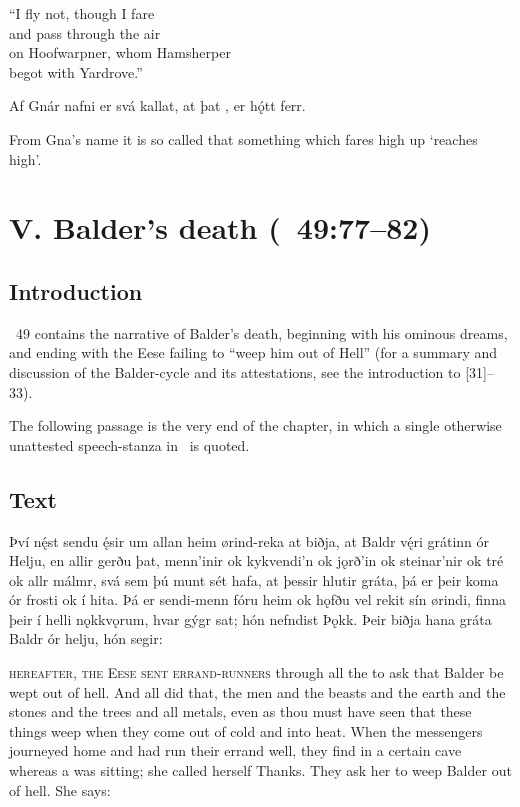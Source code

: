 \bvb “I fly not, though I fare \\
\ind and pass through the air \\
on Hoofwarpner, whom Hamsherper \\
\ind begot with Yardrove.”\evb\evg


\bpg\bpa[0]\pva[26]%
Af Gnár nafni er svá kallat, at þat , er hǫ́tt ferr.\epa

\bpb\pvb[26]%
From Gna’s name it is so called that something which fares high up ‘reaches high’.\epb\epg

\sectionline

\newpage

\section{V. Balder’s death (\Gylfaginning~49:77--82)}\chapterStart%
%

\subsection{Introduction}

\Gylfaginning~49 contains the narrative of Balder’s death, beginning with his ominous dreams, and ending with the Eese failing to “weep him out of Hell” (for a summary and discussion of the Balder-cycle and its attestations, see the introduction to [31]--33).

The following passage is the very end of the chapter, in which a single otherwise unattested speech-stanza in \Ljodahattr\ is quoted.

\subsection{Text}

\bpg\bpa[0]\pva[77]%
Því nę́st sendu ę́sir um allan heim ørind-reka at biðja, at Baldr vę́ri grátinn ór Helju,
\pva en allir gerðu þat, menn’inir ok kykvendi’n ok jǫrð’in ok steinar’nir ok tré ok allr málmr,
\pva svá sem þú munt sét hafa, at þessir hlutir gráta, þá er þeir koma ór frosti ok í hita.
\pva Þá er sendi-menn fóru heim ok hǫfðu vel rekit sín ørindi, finna þeir í helli nǫkkvǫrum, hvar gýgr sat; hón nefndist Þǫkk.
\pva Þeir biðja hana gráta Baldr ór helju, hón segir:\epa

\bpb{}\textsc{hereafter, the Eese sent errand-runners} through all the  to ask that Balder be wept out of hell.
\pvb And all did that, the men and the beasts and the earth and the stones and the trees and all metals,
\pvb even as thou must have seen that these things weep when they come out of cold and into heat.
\pvb When the messengers journeyed home and had run their errand well, they find in a certain cave whereas a  was sitting; she called herself Thanks.
\pvb They ask her to weep Balder out of hell. She says:\epb\epg


